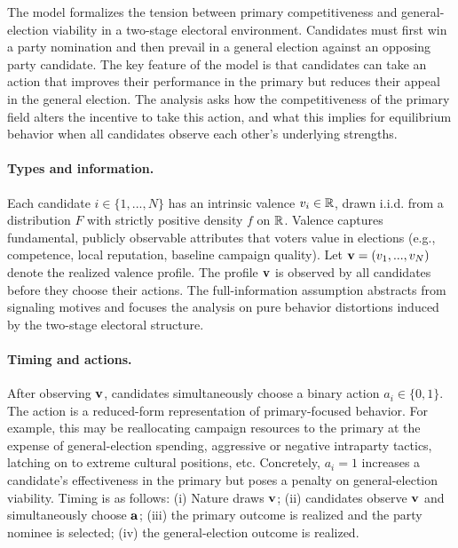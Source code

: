 The model formalizes the tension between primary competitiveness and general-election viability in a two-stage electoral environment. Candidates must first win a party nomination and then prevail in a general election against an opposing party candidate. The key feature of the model is that candidates can take an action that improves their performance in the primary but reduces their appeal in the general election. The analysis asks how the competitiveness of the primary field alters the incentive to take this action, and what this implies for equilibrium behavior when all candidates observe each other’s underlying strengths.

\paragraph{Types and information.}
Each candidate $i \in \{1,...,N\}$ has an intrinsic valence $v_i \in \mathbb{R}$, drawn i.i.d. from a distribution $F$ with strictly positive density $f$ on $\mathbb{R}$. Valence captures fundamental, publicly observable attributes that voters value in elections (e.g., competence, local reputation, baseline campaign quality). Let $\mathbf v = (v_1,...,v_N)$ denote the realized valence profile. The profile $\mathbf v$ is observed by all candidates before they choose their actions. The full-information assumption abstracts from signaling motives and focuses the analysis on pure behavior distortions induced by the two-stage electoral structure.

\paragraph{Timing and actions.}
After observing $\mathbf v$, candidates simultaneously choose a binary action $a_i \in \{0,1\}$. The action is a reduced-form representation of primary-focused behavior. For example, this may be reallocating campaign resources to the primary at the expense of general-election spending, aggressive or negative intraparty tactics, latching on to extreme cultural positions, etc. Concretely, $a_i = 1$ increases a candidate's effectiveness in the primary but poses a penalty on general-election viability. Timing is as follows: (i) Nature draws $\mathbf v$; (ii) candidates observe $\mathbf v$ and simultaneously choose $\mathbf a$; (iii) the primary outcome is realized and the party nominee is selected; (iv) the general-election outcome is realized. 

